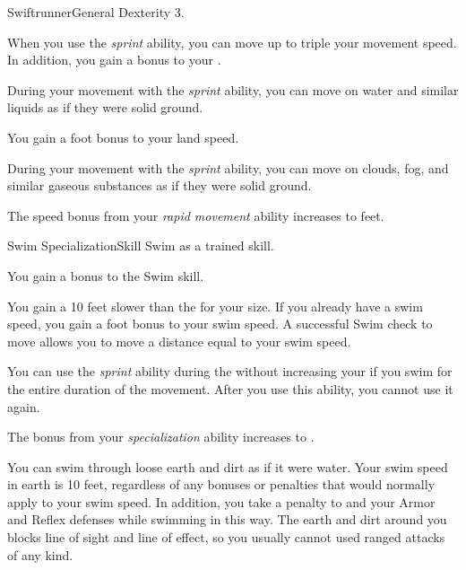     \begin{feat}{Swiftrunner}{General}
        \featpre Dexterity 3.

         When you use the \textit{sprint} ability, you can move up to triple your movement speed.
        In addition, you gain a  bonus to your .

         During your movement with the \textit{sprint} ability, you can move on water and similar liquids as if they were solid ground.

         You gain a  foot bonus to your land speed.

         During your movement with the \textit{sprint} ability, you can move on clouds, fog, and similar gaseous substances as if they were solid ground.

         The speed bonus from your \textit{rapid movement} ability increases to  feet.
    \end{feat}

    \begin{feat}{Swim Specialization}{Skill}
        \featpre Swim as a trained skill.

         You gain a  bonus to the Swim skill.

         You gain a  10 feet slower than the  for your size.
        If you already have a swim speed, you gain a  foot bonus to your swim speed.
        A successful Swim check to move allows you to move a distance equal to your swim speed.

         You can use the \textit{sprint} ability during the  without increasing your  if you swim for the entire duration of the movement.
        After you use this ability, you  cannot use it again.

         The bonus from your \textit{specialization} ability increases to .

         You can swim through loose earth and dirt as if it were water.
        Your swim speed in earth is 10 feet, regardless of any bonuses or penalties that would normally apply to your swim speed.
        In addition, you take a  penalty to  and your Armor and Reflex defenses while swimming in this way.
        The earth and dirt around you blocks line of sight and line of effect, so you usually cannot used ranged attacks of any kind.
    \end{feat}

